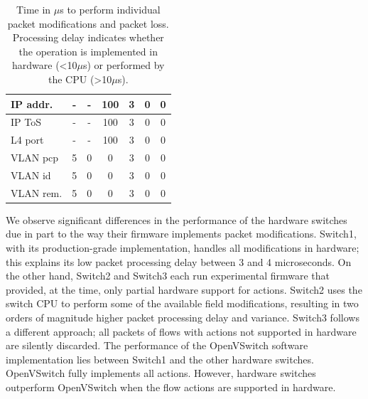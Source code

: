 \begin{table}[tb]
\begin{flushleft}
\begin{tabular}[t]{ |l | c | c | c || c | c | c | }
          \hline  
          IP addr. & - & - &  100 & 3 & 0 & 0 \\
          \hline  
          IP ToS & - & - & 100 & 3 & 0 & 0 \\
          \hline  
          L4 port & - & - & 100 & 3 & 0 & 0 \\
          \hline  
          VLAN pcp & 5 & 0 & 0 & 3 & 0 & 0 \\
          \hline  
          VLAN id & 5 & 0 & 0 & 3 & 0 & 0  \\
          \hline  
          VLAN rem. & 5 & 0 & 0 & 3 & 0 & 0 \\
      \hline
    \end{tabular}
 
\caption{Time in $\mu$s to perform individual packet modifications and packet
loss. Processing delay indicates whether the operation is
  implemented in hardware (\textless10$\mu$s) or performed by the CPU (\textgreater10$\mu$s).}
  \label{tbl:feature_delay}
\end{flushleft}
\end{table}

We observe significant differences in the performance of the hardware
switches due in part to the way their firmware implements packet
modifications. Switch1, with its production-grade implementation,
handles all modifications in hardware; this explains its low packet
processing delay between 3 and 4 microseconds. On the other hand,
Switch2 and Switch3 each run experimental firmware that provided, at the time, only
partial hardware support for \of actions. Switch2 uses the switch
CPU to perform some of the available field modifications, resulting in two orders
of magnitude higher packet processing delay and variance.
Switch3 follows a different approach; all packets of flows with
actions not supported in hardware are silently discarded. The
performance of the OpenVSwitch software implementation lies between
Switch1 and the other hardware switches.  OpenVSwitch fully implements
all \of actions. However, hardware switches outperform
OpenVSwitch when the flow actions are supported in hardware.
%

